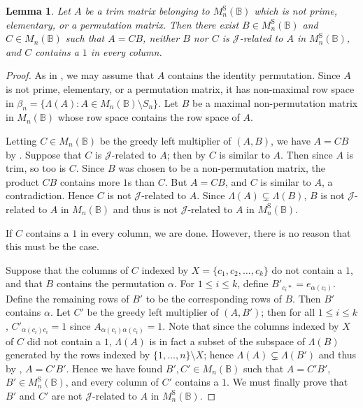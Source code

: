 \documentclass[11pt]{article}
\newtheorem{lemma}[thm]{Lemma}
\numberwithin{equation}{section}
\newcommand{\set}[2]{\ensuremath{\{#1 : #2 \}}}
\newcommand{\B}{\mathbb{B}}
\newcommand{\Bn}{M_n(\B)}
\newcommand{\Halln}{M_n^{\text{S}}(\B)}
\newcommand{\J}{\mathscr{J}}
\newcommand{\RowS}{\Lambda}
\begin{document}
\begin{lemma}
  Let $A$ be a trim matrix belonging to $\Halln$ which is not prime, elementary, or a
  permutation matrix. Then there exist $B \in \Halln$ and $C \in \Bn$ such that
  $A = CB$, neither $B$ nor $C$ is $\J$-related to $A$ in $\Halln$, and $C$
  contains a $1$ in every column.
\end{lemma}
\begin{proof}
  As in , we may assume that $A$ contains the
  identity permutation. Since $A$ is not prime, elementary, or a permutation
  matrix, it has non-maximal row space in
  $\beta_n = \set{\RowS(A)}{A\in \Bn\setminus S_n}$.
  Let $B$ be a maximal
  non-permutation matrix in $\Bn$ whose row space contains the row space of $A$.

  Letting $C \in \Bn$ be the greedy left multiplier of $(A, B)$, we have $A =
  CB$ by . Suppose that $C$ is $\J$-related to $A$;
  then by  $C$ is similar to $A$. Then since $A$ is
  trim, so too is $C$. Since $B$ was chosen to be a non-permutation matrix, the
  product $CB$ contains more $1$s than $C$. But $A = CB$, and $C$ is similar to
  $A$, a contradiction. Hence $C$ is not $\J$-related to $A$. Since $\RowS(A)
  \subsetneq \RowS(B)$, $B$ is not $\J$-related to $A$ in $\Bn$ and thus is not
  $\J$-related to $A$ in $\Halln$.

  If $C$ contains a $1$ in every column, we are done. However, there is no
  reason that this must be the case.

  Suppose that the columns of $C$ indexed by $X = \{c_1, c_2, \ldots, c_k\}$ do
  not contain a $1$, and that $B$ contains the permutation $\alpha$. For $1 \leq
  i \leq k$, define $B'_{c_i*} = e_{\alpha(c_i)}$. Define the remaining rows of
  $B'$ to be the corresponding rows of $B$. Then $B'$ contains $\alpha$. Let
  $C'$ be the greedy left multiplier of $(A, B')$; then for all $1 \leq i \leq
  k$, $C'_{\alpha(c_i)c_i} = 1$ since $A_{\alpha(c_i)\alpha(c_i)} = 1$. Note
  that since the columns indexed by $X$ of $C$ did not contain a $1$, $\RowS(A)$
  is in fact a subset of the subspace of $\RowS(B)$ generated by the rows
  indexed by $\{1, \ldots, n\}\setminus X$; hence $\RowS(A) \subsetneq
  \RowS(B')$ and thus by , $A = C'B'$. Hence we
  have found $B', C' \in \Bn$ such that $A = C'B'$, $B' \in \Halln$, and every
  column of $C'$ contains a $1$. We must finally prove that $B'$ and $C'$ are
  not $\J$-related to $A$ in $\Halln$. 
  

\end{proof}
\end{document}
